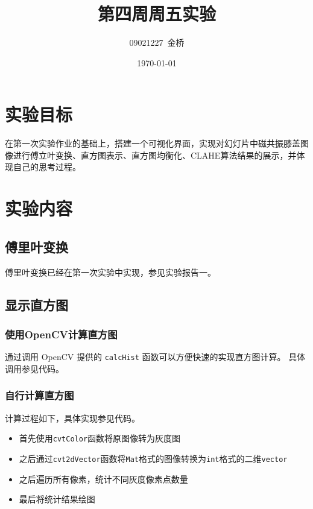 \documentclass{article}
\title{第四周周五实验}
\author{09021227~金桥}
\date{\today}
\begin{document}
\maketitle

\section{实验目标}

在第一次实验作业的基础上，搭建一个可视化界面，实现对幻灯片中磁共振膝盖图像进行傅立叶变换、直方图表示、直方图均衡化、CLAHE算法结果的展示，并体现自己的思考过程。

\section{实验内容}

\subsection{傅里叶变换}

傅里叶变换已经在第一次实验中实现，参见实验报告一。

\subsection{显示直方图}

\subsubsection{使用OpenCV计算直方图}

通过调用 OpenCV 提供的 \texttt{calcHist} 函数可以方便快速的实现直方图计算。
具体调用参见代码。

\subsubsection{自行计算直方图}

计算过程如下，具体实现参见代码。

\begin{itemize}
    \item 首先使用\texttt{cvtColor}函数将原图像转为灰度图
    \item 之后通过\texttt{cvt2dVector}函数将\texttt{Mat}格式的图像转换为\texttt{int}格式的二维\texttt{vector}
    \item 之后遍历所有像素，统计不同灰度像素点数量
    \item 最后将统计结果绘图
\end{itemize}
\end{document}
